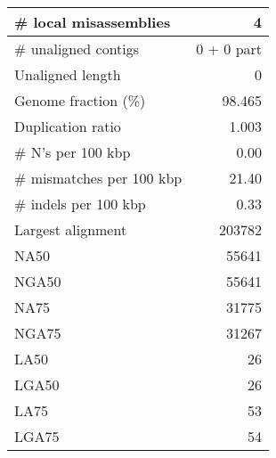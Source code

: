 \documentclass[12pt,a4paper]{article}
\begin{document}
\begin{table}[ht]
\begin{center}
\begin{tabular}{|l*{1}{|r}|}
\# local misassemblies & 4 \\ \hline
\# unaligned contigs & 0 + 0 part \\ \hline
Unaligned length & 0 \\ \hline
Genome fraction (\%) & 98.465 \\ \hline
Duplication ratio & 1.003 \\ \hline
\# N's per 100 kbp & 0.00 \\ \hline
\# mismatches per 100 kbp & 21.40 \\ \hline
\# indels per 100 kbp & 0.33 \\ \hline
Largest alignment & 203782 \\ \hline
NA50 & 55641 \\ \hline
NGA50 & 55641 \\ \hline
NA75 & 31775 \\ \hline
NGA75 & 31267 \\ \hline
LA50 & 26 \\ \hline
LGA50 & 26 \\ \hline
LA75 & 53 \\ \hline
LGA75 & 54 \\ \hline
\end{tabular}
\end{center}
\end{table}
\end{document}
